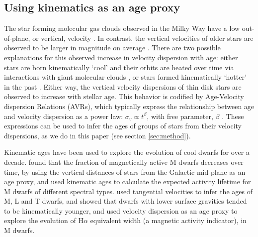 \subsection{Using kinematics as an age proxy}

The star forming molecular gas clouds observed in the Milky Way have a low
out-of-plane, or vertical, velocity \citep[\eg][]{stark1989, stark2005,
aumer2009, martig2014, aumer2016}.
In contrast, the vertical velocities of older stars are observed to be larger
in magnitude on average \citep{stromberg1946, wielen1977, nordstrom2004,
holmberg2007, holmberg2009, aumer2009, casagrande2011, ting2019, yu2018}.
There are two possible explanations for this observed increase in velocity
dispersion with age: either stars are born kinematically `cool' and their
orbits are heated over time via interactions with giant molecular clouds
\citep[see][for a review of secular evolution in the MW]{sellwood2014}, or
stars formed kinematically `hotter' in the past \citep[\eg][]{bird2013}.
Either way, the vertical velocity dispersions of thin disk stars are observed
to increase with stellar age.
This behavior is codified by Age-Velocity dispersion Relations (AVRs), which
typically express the relationship between age and velocity dispersion as a
power law: $\sigma_v \propto t^\beta$, with free parameter, $\beta$
\citep[\eg][]{holmberg2009, yu2018}.
These expressions can be used to infer the ages of groups of stars from their
velocity dispersions, as we do in this paper (see section \ref{sec:method}).

Kinematic ages have been used to explore the evolution of cool dwarfs for over
a decade.
\citet{west2004, west2006} found that the fraction of magnetically active M
dwarfs decreases over time, by using the vertical distances of stars from the
Galactic mid-plane as an age proxy, and \citet{west2008} used kinematic ages
to calculate the expected activity lifetime for M dwarfs of different spectral
types.
\citet{faherty2009} used tangential velocities to infer the ages of M, L and T
dwarfs, and showed that dwarfs with lower surface gravities tended to be
kinematically younger, and \citet{kiman2019} used velocity dispersion as an
age proxy to explore the evolution of H$\alpha$ equivalent width (a magnetic
activity indicator), in M dwarfs.


